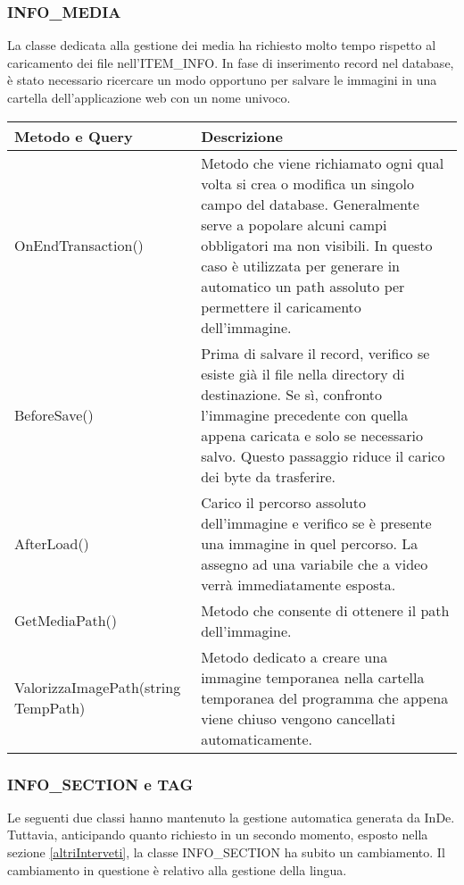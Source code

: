 \subsubsection{INFO\_MEDIA}
La classe dedicata alla gestione dei media ha richiesto molto tempo rispetto al caricamento dei file nell'ITEM\_INFO. In fase di inserimento record nel database, è stato necessario ricercare un modo opportuno per salvare le immagini in una cartella dell'applicazione web con un nome univoco.
\begin{center}
	\begin{tabular}{ p{}|p{8cm} }
		\hline
		\textbf{Metodo e Query} & \textbf{Descrizione}\\
		\hline
		OnEndTransaction() & Metodo che viene richiamato ogni qual volta si crea o modifica un singolo campo del database. Generalmente serve a popolare alcuni campi obbligatori ma non visibili. In questo caso è utilizzata per generare in automatico un path assoluto per permettere il caricamento dell'immagine. \\
		\hline
		BeforeSave()	& Prima di salvare il record, verifico se esiste già il file nella directory di destinazione. Se sì, confronto l'immagine precedente con quella appena caricata e solo se necessario salvo. Questo passaggio riduce il carico dei byte da trasferire.\\
		\hline
		AfterLoad()	& Carico il percorso assoluto dell'immagine e verifico se è presente una immagine in quel percorso. La assegno ad una variabile che a video verrà immediatamente esposta.\\
		\hline
		GetMediaPath()& Metodo che consente di ottenere il path dell'immagine.\\
		\hline
		ValorizzaImagePath(string TempPath)	& Metodo dedicato a creare una immagine temporanea nella cartella temporanea del programma che appena viene chiuso vengono cancellati automaticamente.\\
	
	\end{tabular}
\end{center}

\subsubsection{INFO\_SECTION e TAG}
Le seguenti due classi hanno mantenuto la gestione automatica generata da InDe. Tuttavia, anticipando quanto richiesto in un secondo momento, esposto nella sezione \ref{altriInterveti}, la classe INFO\_SECTION ha subito un cambiamento. Il cambiamento in questione è relativo alla gestione della lingua.

